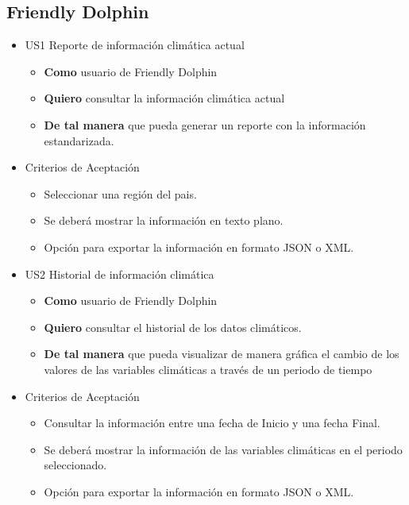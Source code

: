 \subsection*{Friendly Dolphin}
  \begin{itemize}
    \item US1 Reporte de información climática actual
    \begin{itemize}
      \item \textbf{Como} usuario de Friendly Dolphin
      \item \textbf{Quiero} consultar la información climática actual
      \item \textbf{De tal manera} que pueda generar un reporte con la información estandarizada.
    \end{itemize}
    \item Criterios de Aceptación
    \begin{itemize}
      \item Seleccionar una región del pais.
      \item Se deberá mostrar la información en texto plano.
      \item Opción para exportar la información en formato JSON o XML.
    \end{itemize}
  \end{itemize}
  \begin{itemize}
    \item US2 Historial de información climática
    \begin{itemize}
      \item \textbf{Como} usuario de Friendly Dolphin
      \item \textbf{Quiero} consultar el historial de los datos climáticos.
      \item \textbf{De tal manera} que pueda visualizar de manera gráfica el cambio de los valores de las variables climáticas a través de un periodo de tiempo
    \end{itemize}
    \item Criterios de Aceptación
    \begin{itemize}
      \item Consultar la información entre una fecha de Inicio y una fecha Final.
      \item Se deberá mostrar la información de las variables climáticas en el periodo seleccionado.
      \item Opción para exportar la información en formato JSON o XML.
    \end{itemize}
  \end{itemize}
%
%
\newpage
